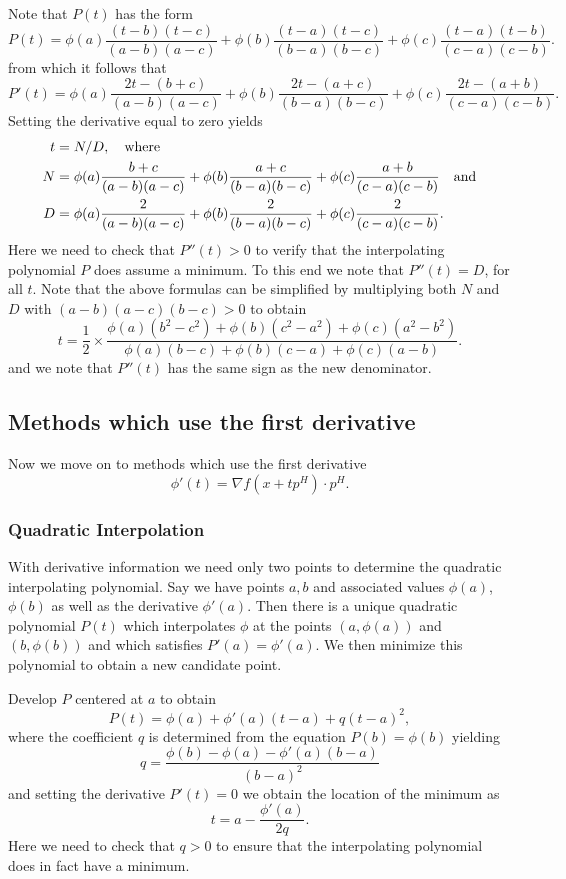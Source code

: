 \noindent
Note that $P(t)$ has the form
$$
P(t)=
\phi(a)\frac{(t-b)(t-c)}{(a-b)(a-c)}+
\phi(b)\frac{(t-a)(t-c)}{(b-a)(b-c)}+
\phi(c)\frac{(t-a)(t-b)}{(c-a)(c-b)}.
$$
from which it follows that
$$
P'(t)=
\phi(a)\frac{2t-(b+c)}{(a-b)(a-c)}+
\phi(b)\frac{2t-(a+c)}{(b-a)(b-c)}+
\phi(c)\frac{2t-(a+b)}{(c-a)(c-b)}.
$$
Setting the derivative equal to zero yields
%
\begin{align*}
t &= N/D,\quad\text{where}\\
N &= 
\phi(a)\frac{b+c}{(a-b)(a-c)}+
\phi(b)\frac{a+c}{(b-a)(b-c)}+
\phi(c)\frac{a+b}{(c-a)(c-b)}\quad\text{and}\\
D &= \phi(a)\frac{2}{(a-b)(a-c)}+
\phi(b)\frac{2}{(b-a)(b-c)}+
\phi(c)\frac{2}{(c-a)(c-b)}.
\end{align*}
%
Here we need to check that $P''(t)>0$ to verify that the interpolating polynomial $P$ does assume a minimum. 
To this end we note that $P''(t)=D$, for all $t$. Note that the above formulas can be simplified by multiplying
both $N$ and $D$ with $(a-b)(a-c)(b-c)>0$ to obtain
%
\begin{equation}
\label{q2_min} 
t=\frac{1}{2}\times
\frac{
\phi(a)(b^2-c^2)+\phi(b)(c^2-a^2)+\phi(c)(a^2-b^2)}
{\phi(a)(b-c)+\phi(b)(c-a)+\phi(c)(a-b)}.
\end{equation}
%
and we note that $P''(t)$ has the same sign as the new denominator.


\subsection{Methods which use the first derivative}

Now we move on to  methods which use the first derivative
$$
\phi'(t)=\nabla f(x+tp^H)\cdot p^H.
$$

\subsubsection{Quadratic Interpolation}
\label{sec:quadratic_approx_deriv}

With derivative information we need only two points to determine the quadratic interpolating polynomial.
Say we have points $a,b$ and associated values $\phi(a)$, $\phi(b)$ as well as the derivative $\phi'(a)$.
Then there is a unique quadratic polynomial $P(t)$ which interpolates $\phi$ at the points $(a,\phi(a))$ and $(b,\phi(b))$
and which satisfies $P'(a)=\phi'(a)$. We then minimize this polynomial to obtain a new candidate point.

\noindent
Develop $P$ centered at $a$ to obtain
$$
P(t)=\phi(a)+\phi'(a)(t-a)+q(t-a)^2,
$$
where the coefficient $q$ is determined from the equation $P(b)=\phi(b)$ yielding
$$
q=\frac{\phi(b)-\phi(a)-\phi'(a)(b-a)}{(b-a)^2}
$$
and setting the derivative $P'(t)=0$ we obtain the location of the minimum as 
%
\begin{equation}
\label{q2_deriv_min}
t = a-\frac{\phi'(a)}{2q}.
\end{equation}
% 
Here we need to check that $q>0$ to ensure that the interpolating polynomial does in fact have a minimum.


